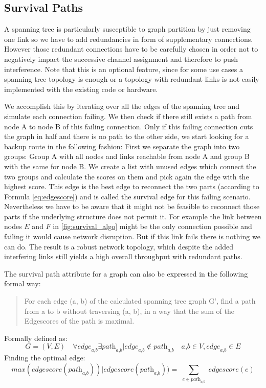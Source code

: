    \subsection{Survival Paths}
      A spanning tree is particularly susceptible to graph partition by just removing one link so we have to add redundancies in form of supplementary connections.
      However those redundant connections have to be carefully chosen in order not to negatively impact the successive channel assignment and therefore to push interference.
      Note that this is an optional feature, since for some use cases a spanning tree topology is enough or a topology with redundant links is not easily implemented
      with the existing code or hardware.  
      
      We accomplish this by iterating over all the edges of the spanning tree and simulate each connection failing. 
      We then check if there still exists a path from node A to node B of this failing connection. 
      Only if this failing connection cuts the graph in half and there is no path to the other side,
      we start looking for a backup route in the following fashion:
      First we separate the graph into two groups: Group A with all nodes and links reachable from node A and group B with the same for node B.
      We create a list with unused edges which connect the two groups and calculate the scores on them and pick again the edge with the highest score.
      This edge is the best edge to reconnect the two parts (according to Formula \ref{eq:edgescore}) and is called the survival edge for this failing scenario.
      Nevertheless we have to be aware that it might not be feasible to reconnect those parts if the underlying structure does not permit it.
      For example the link between nodes \(E\) and \(F\) in \ref{fig:survival_algo} might be the only connection possible and failing it would cause network disruption.
      But if this link fails there is nothing we can do. The result is a robust network topology, 
      which despite the added interfering links still yields a high overall throughput with redundant paths.

      The survival path attribute for a graph can also be expressed in the following formal way:
      \begin{quote}
	For each edge (a, b) of the calculated spanning tree graph G', find a path from a to b without traversing (a, b), 
	in a way that the sum of the Edgescores of the path is maximal.
      \end{quote}
      Formally defined as:
      $$\textit{G}=(\textit{V},\textit{E}) \quad
	\forall \textit{edge}_\textit{a,b} \exists \textit{path}_\textit{a,b} | \textit{edge}_\textit{a,b} \notin \textit{path}_\textit{a,b} \quad
	\textit{a,b} \in \textit{V}, \textit{edge}_\textit{a,b} \in \textit{E}$$
	Finding the optimal edge:
	$$\textit{max}(\textit{edgescore}(\textit{path}_\textit{a,b})) |
	\textit{edgescore}(\textit{path}_\textit{a,b})) = \sum_{\substack{e \in \textit{path}_\textit{a,b}}} \textit{edgescore}(e)$$
	
